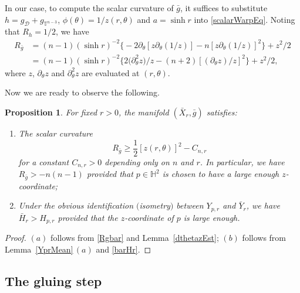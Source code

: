 \documentclass[11pt]{article}
\numberwithin{equation}{section}
\numberwithin{equation}{section}
\newtheorem{Prop}[Theorem]{Proposition}
\def\H{\mathbb{H}}
\def\T{\mathbb{T}}
\def\Dcal{\mathcal{D}}
\begin{document}
In our case, to compute the scalar curvature of $\bar g$, it suffices to substitute
$h = g_\Dcal + g_{\T^{n-3}}$, $\phi(\theta) = 1/z(r,\theta)$ and $a = \sinh r$ into \eqref{scalarWarpEq}. Noting that
$R_h = 1/2$, we have
\begin{align}
	R_{\bar g}&=(n-1)(\sinh r)^{-2}\bigl\{-2\partial_\theta[z\partial_\theta(1/z)]-n[z\partial_\theta(1/z)]^2\bigr\} + z^{2}/2\nonumber\\
	&=(n-1)(\sinh r)^{-2}\bigl\{2\bigl(\partial_\theta^2 z\bigr)/z-(n+2)[(\partial_\theta z)/z]^2\bigr\}	+ z^{2}/2,\label{Rgbar}
		\end{align}		
where $z$, $\partial_\theta z$ and $\partial_\theta^2 z$ are evaluated at $(r,\theta)$.

Now we are ready to observe the following.

\begin{Prop}\label{XrbarInfo}
For fixed $r>0$, the manifold $(\bar X_r, \bar g)$ satisfies:
\begin{enumerate}\itemsep=0pt
\item[$(a)$]  The scalar curvature
\[
	R_{\bar g}\geq \frac{1}{2}[z(r,\theta)]^2-C_{n,r}
\] for a
constant $C_{n,r}>0$ depending only on $n$ and $r$. In particular, we have
$
R_{\bar g}>-n(n-1)
$
provided that $p\in \H^2$ is chosen to have a large enough $z$-coordinate;

\item[$(b)$] Under the obvious identification $($isometry$)$ between $Y_{p,r}$ and $\bar Y_r$, we have
 $\bar H_r >H_{p,r}$ provided that the $z$-coordinate of $p$ is large enough.
 \end{enumerate}
\end{Prop}

\begin{proof}
	 $(a)$ follows from \eqref{Rgbar} and Lemma~\ref{dthetazEst};
	 $(b)$ follows from Lemma~\ref{YprMean}\,$(a)$ and \eqref{barHr}.
\end{proof}

\subsection{The gluing step}\label{gluingSec}
\end{document}
